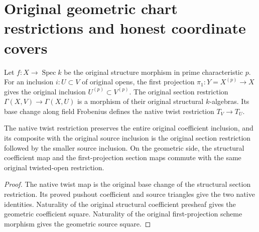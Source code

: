 \section{Original geometric chart restrictions and honest coordinate covers}

\begin{definition}
\label{def:cartier-geometric-twisted-open-restrictions}
\leanok
{}
Let $f:X\to\operatorname{Spec}k$ be the original structure morphism
in prime characteristic $p$. For an inclusion $i:U\subset V$ of
original opens, the first projection $\pi_1:Y=X^{(p)}\to X$ gives
the original inclusion $U^{(p)}\subset V^{(p)}$. The original
section restriction $\Gamma(X,V)\to\Gamma(X,U)$ is a morphism of
their original structural $k$-algebras. Its base change along field
Frobenius defines the native twist restriction $T_V\to T_U$.
\end{definition}

\begin{lemma}
\label{lem:cartier-geometric-twisted-restriction-triangles}
\leanok
{}
The native twist restriction preserves the entire original coefficient
inclusion, and its composite with the original source inclusion is
the original section restriction followed by the smaller source
inclusion. On the geometric side, the structural coefficient map
and the first-projection section maps commute with the same original
twisted-open restriction.
\end{lemma}
\begin{proof}
The native twist map is the original base change of the structural
section restriction. Its proved pushout coefficient and source
triangles give the two native identities. Naturality of the
original structural coefficient presheaf gives the geometric
coefficient square. Naturality of the original first-projection
scheme morphism gives the geometric source square.
\end{proof}

